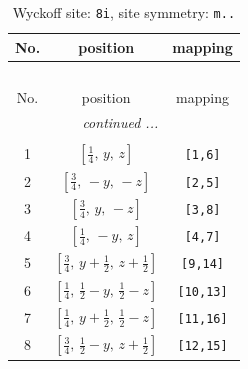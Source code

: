 \documentclass[fleqn,8pt]{jsarticle}
\begin{document}
\begin{longtable}{ccc}
\caption{Wyckoff site: {\tt 8i}, site symmetry: {\tt m..}}
 \\
 \hline \hline
No. & position & mapping \\ \hline \endfirsthead

\multicolumn{2}{l}{\tablename\ \thetable{}} \\
 \hline \hline
No. & position & mapping \\ \hline \endhead

 \hline \hline
\multicolumn{2}{r}{\footnotesize\it continued ...} \\ \endfoot

 \hline \hline
\multicolumn{2}{r}{} \\ \endlastfoot

1 & $\left[ \frac{1}{4},\, y,\, z \right]$ & {\tt [1,6]} \\ \hline
2 & $\left[ \frac{3}{4},\, - y,\, - z \right]$ & {\tt [2,5]} \\ \hline
3 & $\left[ \frac{3}{4},\, y,\, - z \right]$ & {\tt [3,8]} \\ \hline
4 & $\left[ \frac{1}{4},\, - y,\, z \right]$ & {\tt [4,7]} \\ \hline
5 & $\left[ \frac{3}{4},\, y + \frac{1}{2},\, z + \frac{1}{2} \right]$ & {\tt [9,14]} \\ \hline
6 & $\left[ \frac{1}{4},\, \frac{1}{2} - y,\, \frac{1}{2} - z \right]$ & {\tt [10,13]} \\ \hline
7 & $\left[ \frac{1}{4},\, y + \frac{1}{2},\, \frac{1}{2} - z \right]$ & {\tt [11,16]} \\ \hline
8 & $\left[ \frac{3}{4},\, \frac{1}{2} - y,\, z + \frac{1}{2} \right]$ & {\tt [12,15]} \\
\end{longtable}
\renewcommand{\arraystretch}{1.2}
\end{document}
